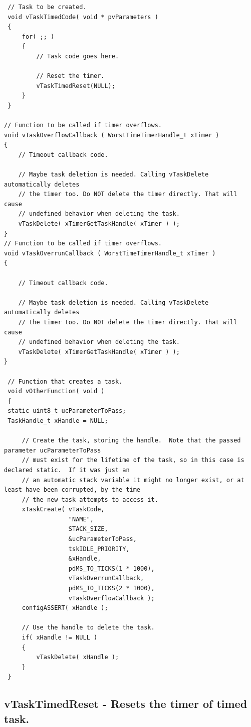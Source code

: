 \begin{verbatim}
 // Task to be created.
 void vTaskTimedCode( void * pvParameters )
 {
     for( ;; )
     {
         // Task code goes here.

         // Reset the timer.
         vTaskTimedReset(NULL);
     }
 }

// Function to be called if timer overflows.
void vTaskOverflowCallback ( WorstTimeTimerHandle_t xTimer )
{
    // Timeout callback code.

    // Maybe task deletion is needed. Calling vTaskDelete automatically deletes
    // the timer too. Do NOT delete the timer directly. That will cause
    // undefined behavior when deleting the task.
    vTaskDelete( xTimerGetTaskHandle( xTimer ) );
}
// Function to be called if timer overflows.
void vTaskOverrunCallback ( WorstTimeTimerHandle_t xTimer )
{

    // Timeout callback code.

    // Maybe task deletion is needed. Calling vTaskDelete automatically deletes
    // the timer too. Do NOT delete the timer directly. That will cause
    // undefined behavior when deleting the task.
    vTaskDelete( xTimerGetTaskHandle( xTimer ) );
}

 // Function that creates a task.
 void vOtherFunction( void )
 {
 static uint8_t ucParameterToPass;
 TaskHandle_t xHandle = NULL;

     // Create the task, storing the handle.  Note that the passed parameter ucParameterToPass
     // must exist for the lifetime of the task, so in this case is declared static.  If it was just an
     // an automatic stack variable it might no longer exist, or at least have been corrupted, by the time
     // the new task attempts to access it.
     xTaskCreate( vTaskCode,
                  "NAME",
                  STACK_SIZE,
                  &ucParameterToPass,
                  tskIDLE_PRIORITY,
                  &xHandle,
                  pdMS_TO_TICKS(1 * 1000),
                  vTaskOverrunCallback,
                  pdMS_TO_TICKS(2 * 1000),
                  vTaskOverflowCallback );
     configASSERT( xHandle );

     // Use the handle to delete the task.
     if( xHandle != NULL )
     {
         vTaskDelete( xHandle );
     }
 }

\end{verbatim}

\subsection{vTaskTimedReset -  Resets the timer of timed task.}
\label{rt_cmd:vTaskTimedReset}



